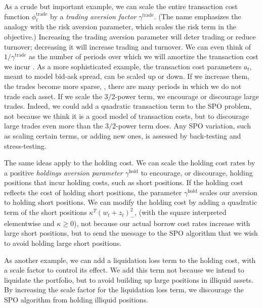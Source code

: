 \documentclass[openany]{article}  %
\newcommand{\trcost}{\phi^\mathrm{trade}}
\begin{document}
As a crude but important example, we can scale the entire transaction cost
function $\trcost_t$ by a \emph{trading aversion factor} $\gamma^\mathrm{trade}$.
(The name emphasizes the analogy with the risk aversion parameter, which scales
the risk term in the objective.)
Increasing the trading aversion parameter will deter trading or reduce turnover;
decreasing it will increase trading and turnover.
We can even think of $1/\gamma^\mathrm{trade}$ as the number of periods
over which we will amortize the transaction cost we incur \cite{grinold2006dynamic}.
As a more sophisticated example, the transaction cost parameters $a_t$, meant to model
bid-ask spread, can be scaled up or down. If we increase them,
the trades become more sparse, \ie, there are many periods in
which we do not trade each asset.  If we scale the $3/2$-power
term, we encourage or discourage large trades.  Indeed, we could add a
quadratic transaction term to the SPO problem, not because we think it is a
good model of transaction costs, but to discourage large trades even more
than the $3/2$-power term does.  Any SPO variation, such as scaling certain terms,
or adding new ones, is assessed by back-testing and stress-testing.

The same ideas apply to the holding cost.
We can scale the holding cost rates by a positive
\emph{holdings aversion parameter} $\gamma^\mathrm{hold}$
to encourage, or discourage, holding positions that incur
holding costs, such as short positions.
If the holding cost reflects the cost of holding short positions,
the parameter $\gamma^\mathrm{hold}$ scales our aversion to
holding short positions.
We can modify the holding cost by adding a quadratic term of the short
positions $\kappa^T (w_t+z_t)_-^2$,
(with the square interpreted elementwise and $\kappa \geq 0$),
not because our actual borrow cost rates increase with large
short positions, but to send the
message to the SPO algorithm that we wish to avoid holding large short positions.

As another example, we can add a liquidation loss term to the
holding cost, with a scale factor to control its effect.
We add this term not because we intend to liquidate the portfolio, but
to avoid building up large positions in illiquid assets.
By increasing the scale factor for the liquidation loss term, we
discourage the SPO algorithm from holding illiquid positions.
%
\end{document}
